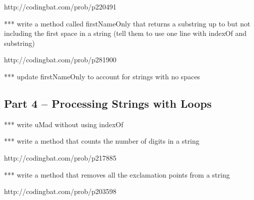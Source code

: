 http://codingbat.com/prob/p220491

*** write a method called firstNameOnly that returns a substring up to but not including the first space in a string (tell them to use one line with indexOf and substring)

http://codingbat.com/prob/p281900

*** update firstNameOnly to account for strings with no spaces

\initialbox


\subsection{Part 4 -- Processing Strings with Loops}

*** write uMad without using indexOf

*** write a method that counts the number of digits in a string

http://codingbat.com/prob/p217885

*** write a method that removes all the exclamation points from a string

http://codingbat.com/prob/p203598

\initialbox

